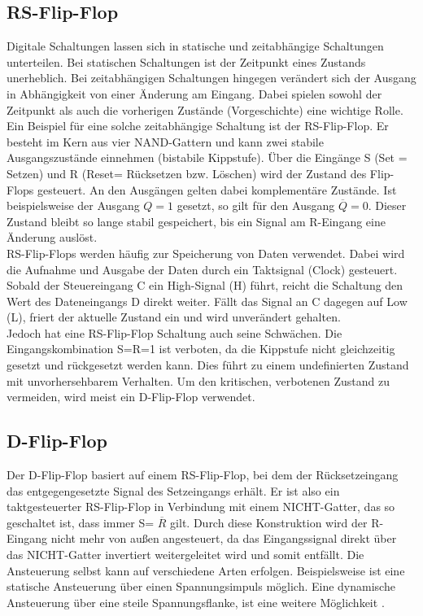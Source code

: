 \subsection*{RS-Flip-Flop}
Digitale Schaltungen lassen sich in statische und zeitabhängige Schaltungen unterteilen. Bei statischen Schaltungen ist der Zeitpunkt eines Zustands unerheblich. Bei zeitabhängigen Schaltungen hingegen verändert sich der Ausgang in Abhängigkeit von einer Änderung am Eingang. Dabei spielen sowohl der Zeitpunkt als auch die vorherigen Zustände (Vorgeschichte) eine wichtige Rolle.\\
Ein Beispiel für eine solche zeitabhängige Schaltung ist der RS-Flip-Flop. Er besteht im Kern aus vier NAND-Gattern und kann zwei stabile Ausgangszustände einnehmen (bistabile Kippstufe). Über die Eingänge S (Set = Setzen) und R (Reset= Rücksetzen bzw. Löschen) wird der Zustand des Flip-Flops gesteuert. An den Ausgängen gelten dabei komplementäre Zustände. Ist beispielsweise der Ausgang $Q=1$ gesetzt, so gilt für den Ausgang  $ \overline{Q} = 0$. Dieser Zustand bleibt so lange stabil gespeichert, bis ein Signal am R-Eingang eine Änderung auslöst.\\
RS-Flip-Flops werden häufig zur Speicherung von Daten verwendet. Dabei wird die Aufnahme und Ausgabe der Daten durch ein Taktsignal (Clock) gesteuert. Sobald der Steuereingang C ein High-Signal (H) führt, reicht die Schaltung den Wert des Dateneingangs D direkt weiter. Fällt das Signal an C dagegen auf Low (L), friert der aktuelle Zustand ein und wird unverändert gehalten.\\
Jedoch hat eine RS-Flip-Flop Schaltung auch seine Schwächen. Die Eingangskombination S=R=1 ist verboten, da die Kippstufe nicht gleichzeitig gesetzt und rückgesetzt werden kann. Dies führt zu einem undefinierten Zustand mit unvorhersehbarem Verhalten. Um den kritischen, verbotenen Zustand zu vermeiden, wird meist ein D-Flip-Flop verwendet\cite{v350_anleitung}. \\
\subsection*{D-Flip-Flop}
Der D-Flip-Flop basiert auf einem RS-Flip-Flop, bei dem der Rücksetzeingang das entgegengesetzte Signal des Setzeingangs erhält. Er ist also ein taktgesteuerter RS-Flip-Flop in Verbindung mit einem NICHT-Gatter, das so geschaltet ist, dass immer S= $ \overline{R} $ gilt. Durch diese Konstruktion wird der R-Eingang nicht mehr von außen angesteuert, da das Eingangssignal direkt über das NICHT-Gatter invertiert weitergeleitet wird und somit entfällt. Die Ansteuerung selbst kann auf verschiedene Arten erfolgen. Beispielsweise ist eine statische Ansteuerung über einen Spannungsimpuls möglich. Eine dynamische Ansteuerung über eine steile Spannungsflanke, ist eine weitere Möglichkeit \cite{DFlipFlop}.\\
